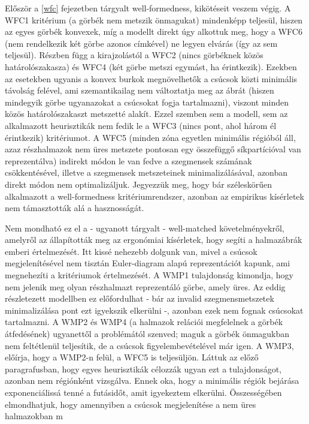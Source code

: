 Először a \ref{wfc} fejezetben tárgyalt well-formedness, kikötéseit veszem végig. A WFC1 kritérium (a görbék nem metszik önmagukat) mindenképp teljesül, hiszen az egyes görbék konvexek, míg a modellt direkt úgy alkottuk meg, hogy a WFC6 (nem rendelkezik két görbe azonos címkével) ne legyen elvárás (így az sem teljesül). Részben függ a kirajzolástól a WFC2 (nincs görbéknek közös határolószakasza) és WFC4 (két görbe metszi egymást, ha érintkezik). Ezekben az esetekben ugyanis a konvex burkok megnövelhetők a csúcsok közti minimális távolság felével, ami szemantikailag nem változtatja meg az ábrát (hiszen mindegyik görbe ugyanazokat a csúcsokat fogja tartalmazni), viszont minden közös határolószakaszt metszetté alakít. Ezzel szemben sem a modell, sem az alkalmazott heurisztikák nem fedik le a WFC3 (nincs pont, ahol három él érintkezik) kritériumot. A WFC5 (minden zóna egyetlen minimális régióból áll, azaz részhalmazok nem üres metszete pontosan egy összefüggő síkpartícióval van reprezentálva) indirekt módon le van fedve a szegmensek számának csökkentésével, illetve a szegmensek metszeteinek minimalizálásával, azonban direkt módon nem optimalizáljuk. Jegyezzük meg, hogy bár széleskörűen alkalmazott a well-formedness kritériumrendszer, azonban az empirikus kísérletek nem támasztották alá a hasznosságát.


Nem mondható ez el a - ugyanott tárgyalt - well-matched követelményekről, amelyről az állapították meg az ergonómiai kísérletek, hogy segíti a halmazábrák emberi értelmezését. Itt kissé nehezebb dolgunk van, mivel a csúcsok megjelenítésével nem tisztán Euler-diagram alapú reprezentációt kapunk, ami megnehezíti a kritériumok értelmezését. A WMP1 tulajdonság kimondja, hogy nem jelenik meg olyan részhalmazt reprezentáló görbe, amely üres. Az eddig részletezett modellben ez előfordulhat - bár az invalid szegmensmetszetek minimalizálása pont ezt igyekszik elkerülni -, azonban ezek nem fognak csúcsokat tartalmazni. A WMP2 és WMP4 (a halmazok relációi megfelelnek a görbék átfedésének) ugyanettől a problémától szenved; maguk a görbék önmagukban nem feltétlenül teljesítik, de a csúcsok figyelembevételével már igen. A WMP3, előírja, hogy  a WMP2-n felül, a WFC5 is teljesüljön. Láttuk az előző paragrafusban, hogy egyes heurisztikák célozzák ugyan ezt a tulajdonságot, azonban nem régiónként vizsgálva. Ennek oka, hogy a minimális régiók bejárása exponenciálissá tenné a futásidőt, amit igyekeztem elkerülni. Összességében elmondhatjuk, hogy amennyiben a csúcsok megjelenítése a nem üres halmazokban m


